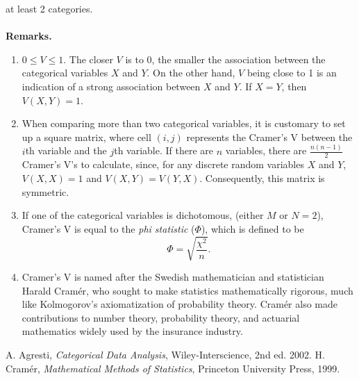 \documentclass[12pt]{article}
\begin{document}
at least 2 categories.
\\\\
\textbf{Remarks.}
\begin{enumerate}
\item $0\leq V\leq 1$.  The closer $V$ is to 0, the smaller the
association between the categorical variables $X$ and $Y$.  On the
other hand, $V$ being close to 1 is an indication of a strong
association between $X$ and $Y$.  If $X=Y$, then $V(X,Y)=1$.
\item When comparing more than two categorical variables, it is
customary to set up a square matrix, where cell $(i,j)$ represents
the Cramer's V between the $i$th variable and the $j$th variable. If
there are $n$ variables, there are $\frac{n(n-1)}{2}$ Cramer's V's
to calculate, since, for any discrete random variables $X$ and $Y$,
$V(X,X)=1$ and $V(X,Y)=V(Y,X)$. Consequently, this matrix is
symmetric.
\item If one of the categorical variables is dichotomous, (either $M$ or $N=2$), Cramer's V is equal to the \emph{phi statistic} ($\Phi$), which is defined to be $$\Phi=\sqrt{\frac{\chi^2}{n}}.$$
\item Cramer's V is named after the Swedish
mathematician and statistician Harald Cram\'{e}r, who sought to make
statistics mathematically rigorous, much like Kolmogorov's
axiomatization of probability theory.  Cram\'{e}r also made
contributions to number theory, probability theory, and actuarial
mathematics widely used by the insurance industry.
\end{enumerate}
\begin{thebibliography}{8}
 A. Agresti, \emph{Categorical Data Analysis}, Wiley-Interscience, 2nd ed. 2002.
 H. Cram\'{e}r, \emph{Mathematical Methods of Statistics}, Princeton University Press, 1999.
\end{thebibliography}
\end{document}

